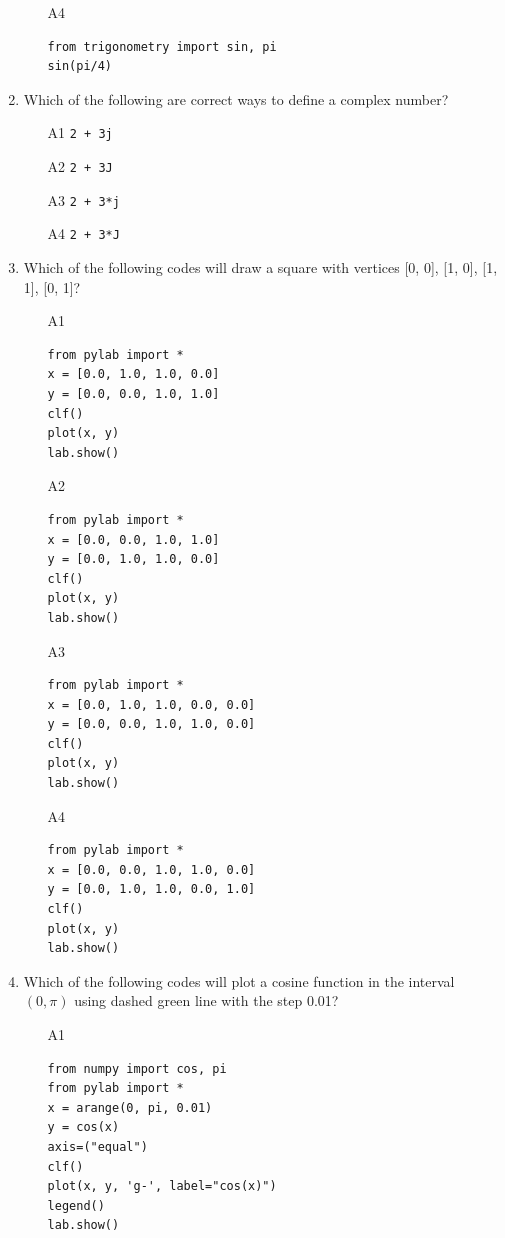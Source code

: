 \begin{enumerate}
\begin{enumerate}
\item[A4] 
\begin{verbatim}
from trigonometry import sin, pi
sin(pi/4)
\end{verbatim}
\end{enumerate}
\item Which of the following are correct ways to define a complex number?
\begin{enumerate}
\item[A1] {\tt 2 + 3j}
\item[A2] {\tt 2 + 3J}
\item[A3] {\tt 2 + 3*j}
\item[A4] {\tt 2 + 3*J}
\end{enumerate}
\item Which of the following codes will draw a square with vertices [0, 0], [1, 0], [1, 1], [0, 1]?
\begin{enumerate}
\item[A1] 
\begin{verbatim}
from pylab import *
x = [0.0, 1.0, 1.0, 0.0]
y = [0.0, 0.0, 1.0, 1.0]
clf()
plot(x, y)
lab.show()
\end{verbatim}
\item[A2] 
\begin{verbatim}
from pylab import *
x = [0.0, 0.0, 1.0, 1.0]
y = [0.0, 1.0, 1.0, 0.0]
clf()
plot(x, y)
lab.show()
\end{verbatim}
\item[A3] 
\begin{verbatim}
from pylab import *
x = [0.0, 1.0, 1.0, 0.0, 0.0]
y = [0.0, 0.0, 1.0, 1.0, 0.0]
clf()
plot(x, y)
lab.show()
\end{verbatim}
\item[A4] 
\begin{verbatim}
from pylab import *
x = [0.0, 0.0, 1.0, 1.0, 0.0]
y = [0.0, 1.0, 1.0, 0.0, 1.0]
clf()
plot(x, y)
lab.show()
\end{verbatim}
\end{enumerate}
\item Which of the following codes will plot a cosine function in the interval $(0, \pi)$ using dashed green line with
the step 0.01?
\begin{enumerate}
\item[A1] 
\begin{verbatim}
from numpy import cos, pi
from pylab import *
x = arange(0, pi, 0.01)
y = cos(x)
axis=("equal")
clf()
plot(x, y, 'g-', label="cos(x)")
legend()
lab.show()
\end{verbatim}

\end{enumerate}
\end{enumerate}
